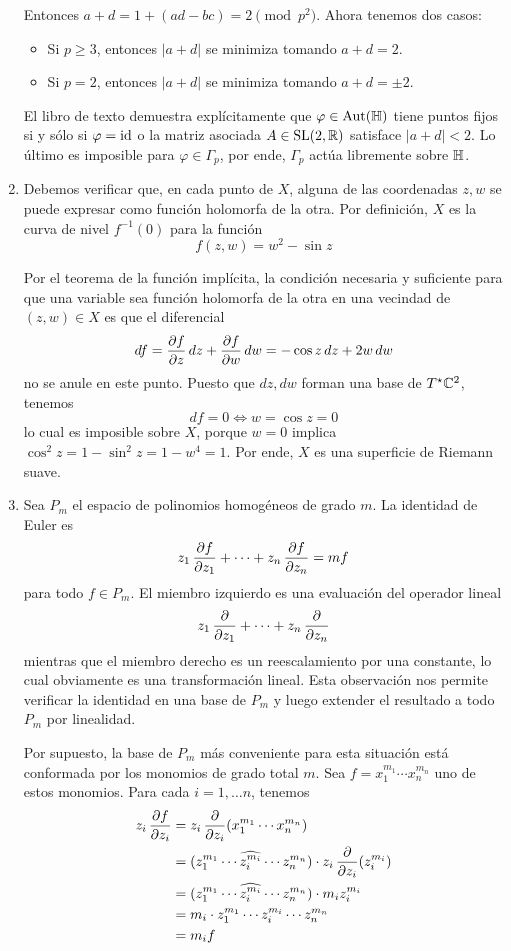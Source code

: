 \begin{solution}
\begin{enumerate}[label=\alph*)]
    Entonces $a + d = 1 + (ad - bc) = 2 \pmod {p^2}$. Ahora tenemos dos casos:
    \begin{itemize}
        \item Si $p \ge 3$, entonces $|a + d|$ se minimiza tomando $a + d = 2$.
        \item Si $p = 2$, entonces $|a + d|$ se minimiza tomando $a + d = \pm 2$.
    \end{itemize}
    
    El libro de texto demuestra explícitamente que $\varphi \in \operatorname{Aut}(\mathbb H)$ tiene puntos fijos si y sólo si $\varphi = \operatorname{id}$ o la matriz asociada $A \in \operatorname{SL}(2, \mathbb R)$ satisface $|a + d| < 2$. Lo último es imposible para $\varphi \in \Gamma_p$, por ende, $\Gamma_p$ actúa libremente sobre $\mathbb H$.
    
    \item Debemos verificar que, en cada punto de $X$, alguna de las coordenadas $z, w$ se puede expresar como función holomorfa de la otra. Por definición, $X$ es la curva de nivel $f^{-1}(0)$ para la función
    $$f(z, w) = w^2 - \sin z$$
    
    Por el teorema de la función implícita, la condición necesaria y suficiente para que una variable sea función holomorfa de la otra en una vecindad de $(z, w) \in X$ es que el diferencial
    $$df = \frac {\partial f} {\partial z} \, dz + \frac {\partial f} {\partial w} \, dw = -\cos z \, dz + 2w \, dw$$
    no se anule en este punto. Puesto que $dz, dw$ forman una base de $T^\star \mathbb C^2$, tenemos
    $$df = 0 \iff w = \cos z = 0$$
    lo cual es imposible sobre $X$, porque $w = 0$ implica $\cos^2 z = 1 - \sin^2 z = 1 - w^4 = 1$. Por ende, $X$ es una superficie de Riemann suave.
    
    \item Sea $P_m$ el espacio de polinomios homogéneos de grado $m$. La identidad de Euler es
    $$z_1 \, \frac {\partial f} {\partial z_1} + \dots + z_n \, \frac {\partial f} {\partial z_n} = mf$$
    para todo $f \in P_m$. El miembro izquierdo es una evaluación del operador lineal
    $$z_1 \, \frac {\partial } {\partial z_1} + \dots + z_n \, \frac {\partial } {\partial z_n}$$
    mientras que el miembro derecho es un reescalamiento por una constante, lo cual obviamente es una transformación lineal. Esta observación nos permite verificar la identidad en una base de $P_m$ y luego extender el resultado a todo $P_m$ por linealidad.
    
    Por supuesto, la base de $P_m$ más conveniente para esta situación está conformada por los monomios de grado total $m$. Sea $f = x_1^{m_1} \cdots x_n^{m_n}$ uno de estos monomios. Para cada $i = 1, \dots n$, tenemos
    \begin{align*}
    z_i \, \frac {\partial f} {\partial z_i}
    & = z_i \, \frac {\partial } {\partial z_i} (x_1^{m_1} \cdots x_n^{m_n}) \\
    & = (z_1^{m_1} \cdots \widehat {z_i^{m_i}} \cdots z_n^{m_n}) \cdot z_i \, \frac {\partial } {\partial z_i} (z_i^{m_i}) \\
    & = (z_1^{m_1} \cdots \widehat {z_i^{m_i}} \cdots z_n^{m_n}) \cdot m_i z_i^{m_i} \\
    & = m_i \cdot z_1^{m_1} \cdots z_i^{m_i} \cdots z_n^{m_n} \\
    & = m_i f
    \end{align*}
    

\end{enumerate}
\end{solution}
